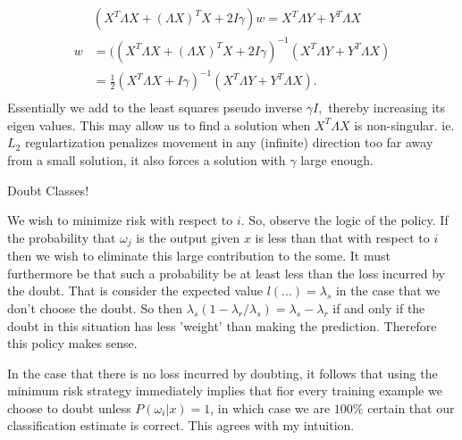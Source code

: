 \documentclass[letter]{article}
\newenvironment{menumerate}{%
  \edef\backupindent{\the\parindent}%
  \enumerate%
  \setlength{\parindent}{\backupindent}%
}{\endenumerate}
\begin{document}
\begin{menumerate}
\begin{menumerate}
    \begin{equation}
      \begin{aligned}
          &(X^T \Lambda X + (\Lambda X)^T X + 2I\gamma)w  =  X^T \Lambda Y  + Y^T\Lambda X \\
          w  &=  ((X^T \Lambda X + (\Lambda X)^T X + 2I\gamma)^{-1}(X^T \Lambda Y  + Y^T\Lambda X) \\
          &=  \frac12(X^T\Lambda X + I\gamma)^{-1}(X^T \Lambda Y  + Y^T\Lambda X) .\\
      \end{aligned}
    \end{equation}
    Essentially we add to the least squares pseudo inverse $\gamma I,$ thereby increasing its eigen values.
    This may allow us to find a solution when $X^T\Lambda X$ is non-singular. ie. $L_2$ regulartization penalizes
    movement in any (infinite) direction too far away from a small solution, it also forces a solution with $\gamma$ large enough.
  \end{menumerate}
  \newpage
  \item Doubt Classes!
  \begin{menumerate}
    \item We wish to minimize risk with respect to $i$. So, 
    observe the logic of the policy. If the probability that $\omega_j$ is the output
    given $x$ is less than that with respect to $i$ then we wish to eliminate this large contribution to the some.
    It must furthermore be that such a probability be at least less than the loss incurred
    by the doubt. That is consider the expected value $l(...) = \lambda_s$ in the case that we don't 
    choose the doubt. So then $\lambda_s(1-\lambda_r/\lambda_s) = \lambda_s - \lambda_r$ if
    and only if the doubt in this situation has less 'weight' than making the prediction. 
    Therefore this policy makes sense.
    \item In the case that there is no loss incurred by doubting,
    it follows that using the minimum risk strategy immediately implies
    that fior every training example we choose to doubt unless
    $P(\omega_i|x) = 1$, in which case we are $100\%$ certain
    that our classification estimate is correct. This agrees with my intuition.


\end{menumerate}
\end{menumerate}
\end{document}
